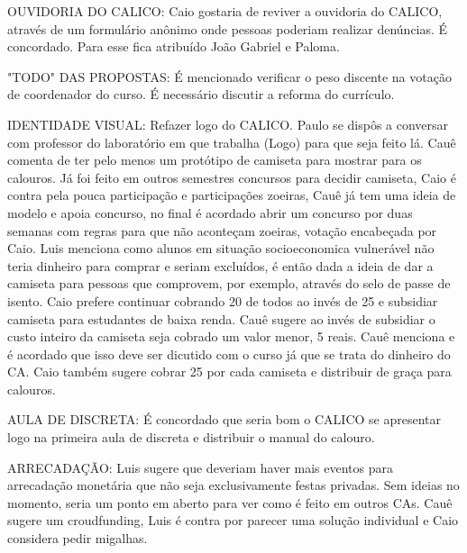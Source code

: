 \documentclass{ata-calico}
\begin{document}
OUVIDORIA DO CALICO:
Caio gostaria de reviver a ouvidoria do CALICO, através de um formulário anônimo onde pessoas poderiam realizar denúncias. É concordado. Para esse fica atribuído João Gabriel e Paloma.\newline

"TODO" DAS PROPOSTAS:
É mencionado verificar o peso discente na votação de coordenador do curso.
É necessário discutir a reforma do currículo.\newline

IDENTIDADE VISUAL:
Refazer logo do CALICO. Paulo se dispôs a conversar com professor do laboratório em que trabalha (Logo) para que seja feito lá.
Cauê comenta de ter pelo menos um protótipo de camiseta para mostrar para os calouros. Já foi feito em outros semestres concursos para decidir camiseta, Caio é contra pela pouca participação e participações zoeiras, Cauê já tem uma ideia de modelo e apoia concurso, no final é acordado abrir um concurso por duas semanas com regras para que não aconteçam zoeiras, votação encabeçada por Caio. Luis menciona como alunos em situação socioeconomica vulnerável não teria dinheiro para comprar e seriam excluídos, é então dada a ideia de dar a camiseta para pessoas que comprovem, por exemplo, através do selo de passe de isento. Caio prefere continuar cobrando 20 de todos ao invés de 25 e subsidiar camiseta para estudantes de baixa renda. Cauê sugere ao invés de subsidiar o custo inteiro da camiseta seja cobrado um valor menor, 5 reais. Cauê menciona e é acordado que isso deve ser dicutido com o curso já que se trata do dinheiro do CA. Caio também sugere cobrar 25 por cada camiseta e distribuir de graça para calouros.\newline

AULA DE DISCRETA:
É concordado que seria bom o CALICO se apresentar logo na primeira aula de discreta e distribuir o manual do calouro.\newline

ARRECADAÇÃO:
Luis sugere que deveriam haver mais eventos para arrecadação monetária que não seja exclusivamente festas privadas. Sem ideias no momento, seria um ponto em aberto para ver como é feito em outros CAs.
Cauê sugere um croudfunding, Luis é contra por parecer uma solução individual e Caio considera pedir migalhas.\newline
\end{document}
